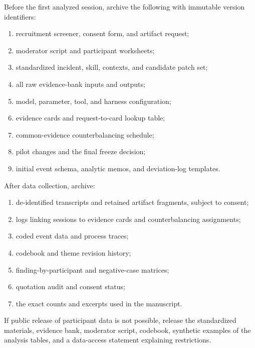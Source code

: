 Before the first analyzed session, archive the following with immutable version
identifiers:

\begin{enumerate}[leftmargin=*]
    \item recruitment screener, consent form, and artifact request;
    \item moderator script and participant worksheets;
    \item standardized incident, skill, contexts, and candidate patch set;
    \item all raw evidence-bank inputs and outputs;
    \item model, parameter, tool, and harness configuration;
    \item evidence cards and request-to-card lookup table;
    \item common-evidence counterbalancing schedule;
    \item pilot changes and the final freeze decision;
    \item initial event schema, analytic memos, and deviation-log templates.
\end{enumerate}

After data collection, archive:

\begin{enumerate}[leftmargin=*]
    \item de-identified transcripts and retained artifact fragments, subject to
    consent;
    \item logs linking sessions to evidence cards and counterbalancing assignments;
    \item coded event data and process traces;
    \item codebook and theme revision history;
    \item finding-by-participant and negative-case matrices;
    \item quotation audit and consent status;
    \item the exact counts and excerpts used in the manuscript.
\end{enumerate}

If public release of participant data is not possible, release the standardized
materials, evidence bank, moderator script, codebook, synthetic examples of the
analysis tables, and a data-access statement explaining restrictions.

